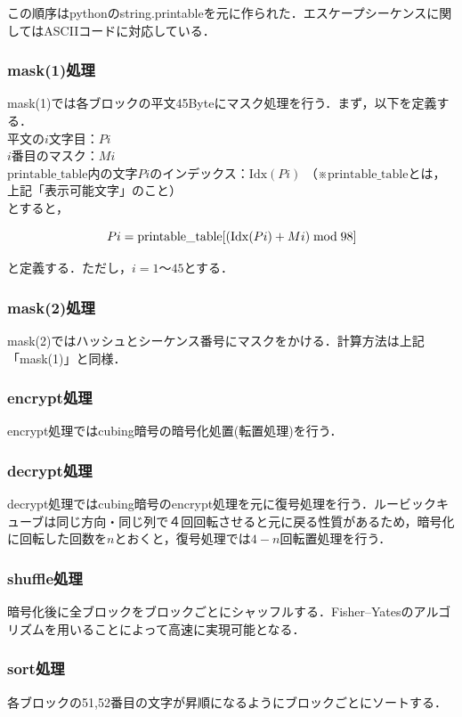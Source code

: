 \documentclass[a4p]{jarticle}
\begin{document}
この順序はpythonのstring.printableを元に作られた．エスケープシーケンスに関してはASCIIコードに対応している．

\subsubsection{mask(1)処理}
mask(1)では各ブロックの平文45Byteにマスク処理を行う．まず，以下を定義する．\\
平文の\(i\)文字目：\(Pi\)\\
\(i\)番目のマスク：\(Mi\)\\
\(\mathrm{printable\_table}\)内の文字\(Pi\)のインデックス：\(\mathrm{Idx}(Pi)\) （※\(\mathrm{printable\_table}\)とは，上記「表示可能文字」のこと）\\
とすると，


\[Pi=\mathrm{printable\_table}[(\mathrm{Idx}(Pi)+Mi) \bmod 98]\\\]


と定義する．ただし，\(i=1〜45\)とする．

\subsubsection{mask(2)処理}
mask(2)ではハッシュとシーケンス番号にマスクをかける．計算方法は上記「mask(1)」と同様．

\subsubsection{encrypt処理}
encrypt処理ではcubing暗号の暗号化処置(転置処理)を行う．

\subsubsection{decrypt処理}
decrypt処理ではcubing暗号のencrypt処理を元に復号処理を行う．ルービックキューブは同じ方向・同じ列で４回回転させると元に戻る性質があるため，暗号化に回転した回数を\(n\)とおくと，復号処理では\(4-n\)回転置処理を行う．

\subsubsection{shuffle処理}
暗号化後に全ブロックをブロックごとにシャッフルする．Fisher–Yatesのアルゴリズムを用いることによって高速に実現可能となる．

\subsubsection{sort処理}
各ブロックの51,52番目の文字が昇順になるようにブロックごとにソートする．
\end{document}
